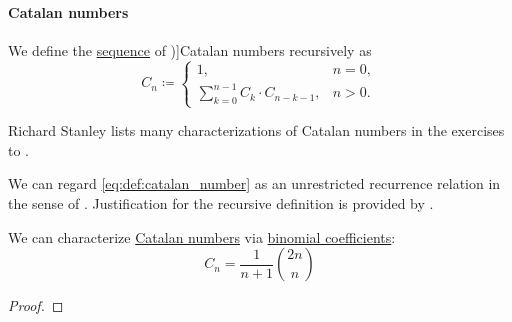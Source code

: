 \paragraph{Catalan numbers}

\begin{definition}\label{def:catalan_number}
  We define the \hyperref[def:sequence]{sequence} of \term[ru=число Каталана (\cite[\S 5.7.4]{Новиков2013ДискретнаяМатематика})]{Catalan numbers} recursively as
  \begin{equation}\label{eq:def:catalan_number}
    C_n \coloneqq \begin{cases}
      1,                                    &n = 0, \\
      \sum_{k=0}^{n-1} C_k \cdot C_{n-k-1}, &n > 0.
    \end{cases}
  \end{equation}
\end{definition}
\begin{comments}
  \item Richard Stanley lists many characterizations of Catalan numbers in the exercises to \cite[ch. 6]{Stanley2023EnumerativeCombinatoricsVol2}.

  \item We can regard \eqref{eq:def:catalan_number} as an unrestricted recurrence relation in the sense of . Justification for the recursive definition is provided by .
\end{comments}

\begin{proposition}\label{thm:catalan_number_via_binomial_coefficients}
  We can characterize \hyperref[def:catalan_number]{Catalan numbers} via \hyperref[def:binomial_coefficient]{binomial coefficients}:
  \begin{equation}\label{eq:thm:catalan_number_via_binomial_coefficients}
    C_n = \frac 1 {n + 1} \binom {2n} n
  \end{equation}
\end{proposition}
\begin{proof}
\end{proof}

